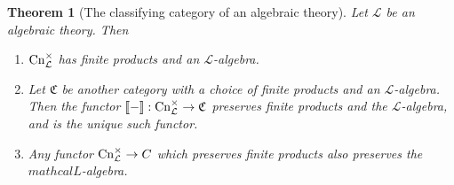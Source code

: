 \documentclass[12pt,twoside]{reedthesis}
\theoremstyle{definition}
\theoremstyle{remark}
\theoremstyle{plain}
\newtheorem{theorem}{Theorem}
\begin{document}
\begin{theorem}[The classifying category of an algebraic
  theory]\label{thm:classifying alg theory} Let \( \mathcal{L} \) be an
  algebraic theory. Then \begin{enumerate}
    \item $\mathrm{Cn}_\mathcal{L}^{\times}$ has finite products and an $\mathcal{L}$-algebra.
    \item Let $\mathfrak{C}$ be another category with a choice of finite
    products and an $\mathcal{L}$-algebra. Then the functor $\llbracket-\rrbracket :
    \mathrm{Cn}_{\mathcal{L}}^{\times} \rightarrow \mathfrak{C}$ preserves finite
    products and the $\mathcal{L}$-algebra, and is the unique such functor.
    \item Any functor \( \mathrm{Cn}_{\mathcal{L}}^{\times} \rightarrow C \) which
    preserves finite products also preserves the $mathcal{L}$-algebra.
  \end{enumerate}
\end{theorem}
\newcommand{\ob}{\mathrm{ob}\,}
\end{document}
